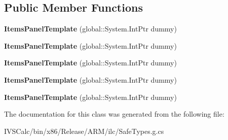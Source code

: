 \subsection*{Public Member Functions}
\begin{DoxyCompactItemize}
\item 
\mbox{\label{class_windows_1_1_u_i_1_1_xaml_1_1_controls_1_1_items_panel_template_ad04d2c1b31c79222b3fe6151f5af7218}} 
{\bfseries Items\+Panel\+Template} (global\+::\+System.\+Int\+Ptr dummy)
\item 
\mbox{\label{class_windows_1_1_u_i_1_1_xaml_1_1_controls_1_1_items_panel_template_ad04d2c1b31c79222b3fe6151f5af7218}} 
{\bfseries Items\+Panel\+Template} (global\+::\+System.\+Int\+Ptr dummy)
\item 
\mbox{\label{class_windows_1_1_u_i_1_1_xaml_1_1_controls_1_1_items_panel_template_ad04d2c1b31c79222b3fe6151f5af7218}} 
{\bfseries Items\+Panel\+Template} (global\+::\+System.\+Int\+Ptr dummy)
\item 
\mbox{\label{class_windows_1_1_u_i_1_1_xaml_1_1_controls_1_1_items_panel_template_ad04d2c1b31c79222b3fe6151f5af7218}} 
{\bfseries Items\+Panel\+Template} (global\+::\+System.\+Int\+Ptr dummy)
\item 
\mbox{\label{class_windows_1_1_u_i_1_1_xaml_1_1_controls_1_1_items_panel_template_ad04d2c1b31c79222b3fe6151f5af7218}} 
{\bfseries Items\+Panel\+Template} (global\+::\+System.\+Int\+Ptr dummy)
\end{DoxyCompactItemize}


The documentation for this class was generated from the following file\+:\begin{DoxyCompactItemize}
\item 
I\+V\+S\+Calc/bin/x86/\+Release/\+A\+R\+M/ilc/Safe\+Types.\+g.\+cs\end{DoxyCompactItemize}
